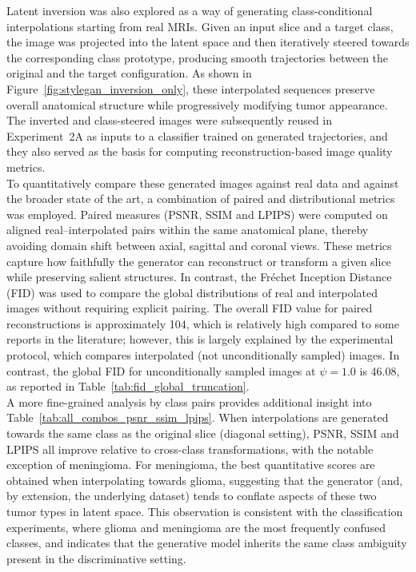 Latent inversion was also explored as a way of generating class-conditional interpolations starting from real MRIs. Given an input slice and a target class, the image was projected into the latent space and then iteratively steered towards the corresponding class prototype, producing smooth trajectories between the original and the target configuration. As shown in Figure~\ref{fig:stylegan_inversion_only}, these interpolated sequences preserve overall anatomical structure while progressively modifying tumor appearance. The inverted and class-steered images were subsequently reused in Experiment~2A as inputs to a classifier trained on generated trajectories, and they also served as the basis for computing reconstruction-based image quality metrics.\\

To quantitatively compare these generated images against real data and against the broader state of the art, a combination of paired and distributional metrics was employed. Paired measures (PSNR, SSIM and LPIPS) were computed on aligned real--interpolated pairs within the same anatomical plane, thereby avoiding domain shift between axial, sagittal and coronal views. These metrics capture how faithfully the generator can reconstruct or transform a given slice while preserving salient structures. In contrast, the Fréchet Inception Distance (FID) was used to compare the global distributions of real and interpolated images without requiring explicit pairing. The overall FID value for paired reconstructions is approximately 104, which is relatively high compared to some reports in the literature; however, this is largely explained by the experimental protocol, which compares interpolated (not unconditionally sampled) images. In contrast, the global FID for unconditionally sampled images at $\psi = 1.0$ is 46.08, as reported in Table~\ref{tab:fid_global_truncation}.\\

A more fine-grained analysis by class pairs provides additional insight into Table~\ref{tab:all_combos_psnr_ssim_lpips}. When interpolations are generated towards the same class as the original slice (diagonal setting), PSNR, SSIM and LPIPS all improve relative to cross-class transformations, with the notable exception of meningioma. For meningioma, the best quantitative scores are obtained when interpolating towards glioma, suggesting that the generator (and, by extension, the underlying dataset) tends to conflate aspects of these two tumor types in latent space. This observation is consistent with the classification experiments, where glioma and meningioma are the most frequently confused classes, and indicates that the generative model inherits the same class ambiguity present in the discriminative setting.\\

